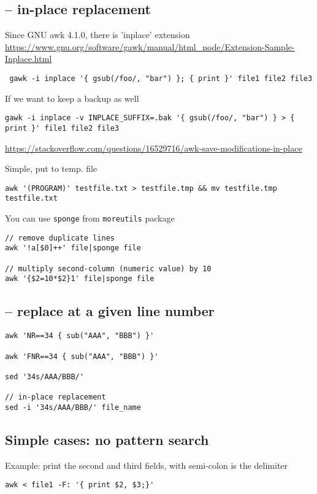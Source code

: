 \subsection{-- in-place replacement}

Since GNU awk 4.1.0, there is 'inplace' extension
\url{https://www.gnu.org/software/gawk/manual/html_node/Extension-Sample-Inplace.html}
\begin{verbatim}
 gawk -i inplace '{ gsub(/foo/, "bar") }; { print }' file1 file2 file3
\end{verbatim}
If we want to keep a backup as well
\begin{verbatim}
gawk -i inplace -v INPLACE_SUFFIX=.bak '{ gsub(/foo/, "bar") } > { print }' file1 file2 file3
\end{verbatim}
\url{https://stackoverflow.com/questions/16529716/awk-save-modifications-in-place}

Simple, put to temp. file
\begin{verbatim}
awk '(PROGRAM)' testfile.txt > testfile.tmp && mv testfile.tmp testfile.txt
\end{verbatim}


You can use \verb!sponge! from \verb!moreutils! package
\begin{verbatim}
// remove duplicate lines
awk '!a[$0]++' file|sponge file

// multiply second-column (numeric value) by 10
awk '{$2=10*$2}1' file|sponge file
\end{verbatim}


\subsection{-- replace at a given line number}


\begin{verbatim}
awk 'NR==34 { sub("AAA", "BBB") }'

awk 'FNR==34 { sub("AAA", "BBB") }'

sed '34s/AAA/BBB/'

// in-place replacement
sed -i '34s/AAA/BBB/' file_name

\end{verbatim}
\subsection{Simple cases: no pattern search}


Example: print the second and third fields, with semi-colon is the delimiter
\begin{verbatim}
awk < file1 -F: '{ print $2, $3;}'
\end{verbatim}

